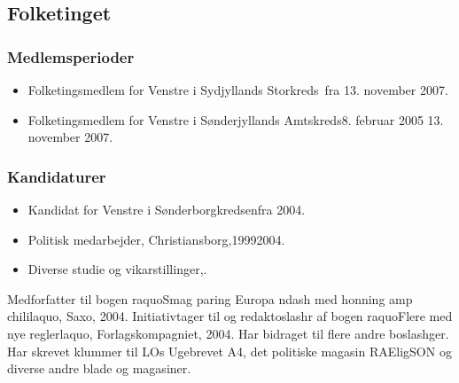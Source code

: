 \documentclass[11pt, a4paper]{awesome-cv}
\begin{document}
\begin{cvletter}
\subsection*{Folketinget}
\subsubsection*{Medlemsperioder}
\begin{itemize}
\item Folketingsmedlem for Venstre i Sydjyllands Storkreds fra 13. november 2007.
\item Folketingsmedlem for Venstre i Sønderjyllands Amtskreds8. februar 2005  13. november 2007.
\end{itemize}
\subsubsection*{Kandidaturer}
\begin{itemize}
\item Kandidat for Venstre i Sønderborgkredsenfra 2004.
\end{itemize}
\begin{itemize}
\item Politisk medarbejder, Christiansborg,19992004.
\item Diverse studie og vikarstillinger,.
\end{itemize}
Medforfatter til bogen raquoSmag paring Europa ndash med honning amp chililaquo, Saxo, 2004. Initiativtager til og redaktoslashr af bogen raquoFlere med  nye reglerlaquo, Forlagskompagniet, 2004. Har bidraget til flere andre boslashger. Har skrevet klummer til LOs Ugebrevet A4, det politiske magasin RAEligSON og diverse andre blade og magasiner.

\end{cvletter}
\end{document}

